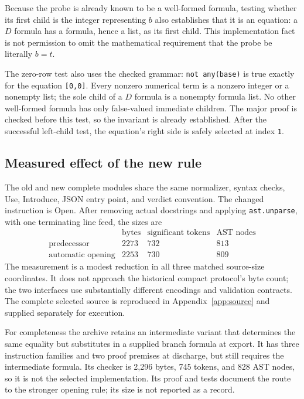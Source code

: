 Because the probe is already known to be a well-formed formula, testing
whether its first child is the integer representing $b$ also establishes
that it is an equation: a $D$ formula has a formula, hence a list, as its
first child.  This implementation fact is not permission to omit the
mathematical requirement that the probe be literally $b=t$.

The zero-row test also uses the checked grammar: \texttt{not any(base)}
is true exactly for the equation \texttt{[0,0]}.  Every nonzero numerical
term is a nonzero integer or a nonempty list; the sole child of a $D$
formula is a nonempty formula list.  No other well-formed formula has
only false-valued immediate children.  The major proof is checked before
this test, so the invariant is already established.  After the successful
left-child test, the equation's right side is safely selected at index
\texttt{1}.

\subsection{Measured effect of the new rule}

The old and new complete modules share the same normalizer, syntax checks,
Use, Introduce, JSON entry point, and verdict convention.  The changed
instruction is Open.  After removing actual docstrings and applying
\texttt{ast.unparse}, with one terminating line feed, the sizes are
\[
\begin{array}{c|rrr}
 &\text{bytes}&\text{significant tokens}&\text{AST nodes}\\\hline
 \text{predecessor}&2273&732&813\\
 \text{automatic opening}&2253&730&809
\end{array}
\]
The measurement is a modest reduction in all three matched source-size
coordinates.  It does not approach the historical compact protocol's byte
count; the two interfaces use substantially different encodings and
validation contracts.  The complete selected source is reproduced in
Appendix~\ref{app:source} and supplied separately for execution.

For completeness the archive retains an intermediate variant that
determines the same equality but substitutes in a supplied branch formula
at export.  It has three instruction families and two proof premises at
discharge, but still requires the intermediate formula.  Its checker is
2,296 bytes, 745 tokens, and 828 AST nodes, so it is not the selected
implementation.  Its proof and tests document the route to the stronger
opening rule; its size is not reported as a record.

